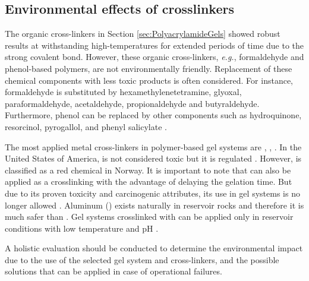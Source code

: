 \subsection{Environmental effects of crosslinkers}

 The organic cross-linkers  in Section \ref{sec:PolyacrylamideGels} showed robust results at withstanding high-temperatures for extended periods of time due to the strong covalent bond. However, these organic cross-linkers, \textit{e.g.}, formaldehyde and phenol-based polymers, are not environmentally friendly. Replacement of these chemical components with less toxic products is often considered. For instance, formaldehyde is substituted by hexamethylenetetramine, glyoxal, paraformaldehyde, acetaldehyde, propionaldehyde and butyraldehyde. Furthermore, phenol can be replaced by other components such as hydroquinone, resorcinol, pyrogallol, and phenyl salicylate \citep{SinghYadav2013}.

The most applied metal cross-linkers in polymer-based gel systems are , , . In the United States of America,   is not considered toxic but it is regulated \citep{AgencyforToxicSubstancesandDiseaseRegistry2012}. However,  is classified as a red chemical in Norway. It is important to note that  can also be applied as a crosslinking with the advantage of delaying the gelation time. But due to its proven toxicity and carcinogenic attributes, its use in gel systems is no longer allowed \citep{Al-Muntasheri2012}. Aluminum () exists naturally in reservoir rocks and therefore it is much safer than . Gel systems crosslinked with  can be applied only in reservoir conditions with low temperature and pH \citep{Xin2013, Osman2013}.

A holistic evaluation should be conducted to determine the environmental impact due to the use of the selected gel system and cross-linkers, and the possible solutions that can be applied in case of operational failures.
